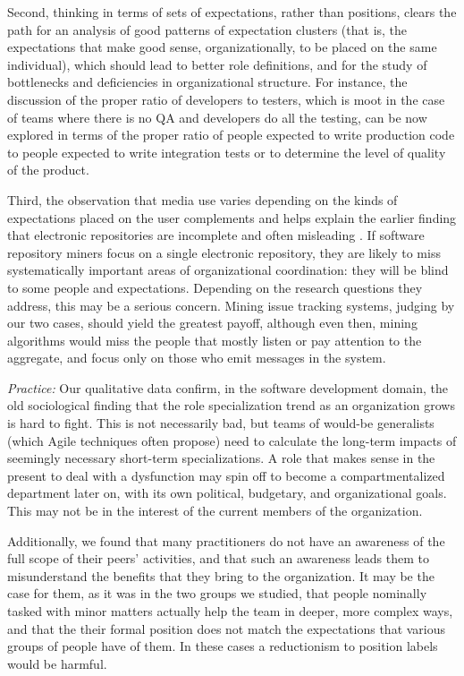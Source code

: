 \documentclass[10pt, conference, compsocconf]{IEEEtran}
\begin{document}
Second, thinking in terms of sets of expectations, rather than positions, clears the path for an analysis of good patterns of expectation clusters (that is, the expectations that make good sense, organizationally, to be placed on the same individual), which should lead to better role definitions, and for the study of bottlenecks and deficiencies in organizational structure. For instance, the discussion of the proper ratio of developers to testers, which is moot in the case of teams where there is no QA and developers do all the testing, can be now explored in terms of the proper ratio of people expected to write production code to people expected to write integration tests or to determine the level of quality of the product.

Third, the observation that media use varies depending on the kinds of expectations placed on the user complements and helps explain the earlier finding that electronic repositories are incomplete and often misleading \cite{Aranda2009}. If software repository miners focus on a single electronic repository, they are likely to miss systematically important areas of organizational coordination: they will be blind to some people and expectations. Depending on the research questions they address, this may be a serious concern. Mining issue tracking systems, judging by our two cases, should yield the greatest payoff, although even then, mining algorithms would miss the people that mostly listen or pay attention to the aggregate, and focus only on those who emit messages in the system.

\emph{Practice:} Our qualitative data confirm, in the software development domain, the old sociological finding that the role specialization trend as an organization grows is hard to fight. This is not necessarily bad, but teams of would-be generalists (which Agile techniques often propose) need to calculate the long-term impacts of seemingly necessary short-term specializations. A role that makes sense in the present to deal with a dysfunction may spin off to become a compartmentalized department later on, with its own political, budgetary, and organizational goals. This may not be in the interest of the current members of the organization.

Additionally, we found that many practitioners do not have an awareness of the full scope of their peers' activities, and that such an awareness leads them to misunderstand the benefits that they bring to the organization. It may be the case for them, as it was in the two groups we studied, that people nominally tasked with minor matters actually help the team in deeper, more complex ways, and that the their formal position does not match the expectations that various groups of people have of them. In these cases a reductionism to position labels would be harmful.
\end{document}
